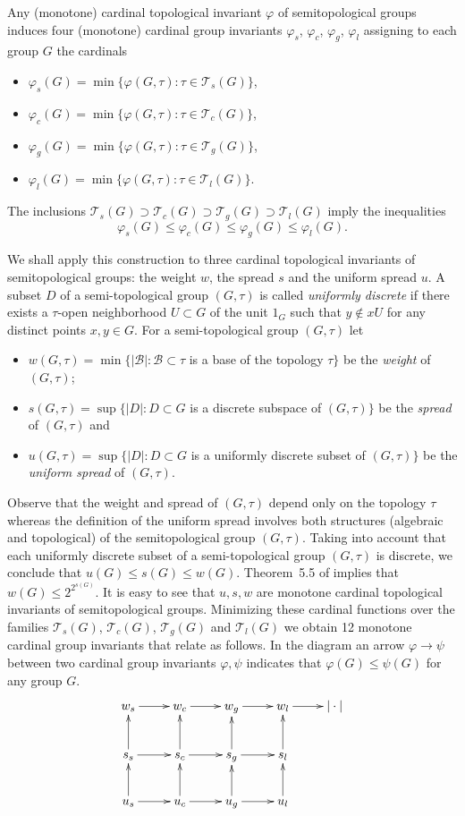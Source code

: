 \documentclass[11pt, twoside]{amsart}
\theoremstyle{definition}
\begin{document}
Any (monotone) cardinal topological invariant $\varphi$ of semitopological groups induces four (monotone) cardinal group invariants $\varphi_s$, $\varphi_c$, $\varphi_g$, $\varphi_l$ assigning to each group $G$ the cardinals
\begin{itemize}
\item $\varphi_s(G)=\min\{\varphi(G,\tau):\tau\in{\mathcal T}_s(G)\}$,
\item $\varphi_c(G)=\min\{\varphi(G,\tau):\tau\in{\mathcal T}_c(G)\}$,
\item $\varphi_g(G)=\min\{\varphi(G,\tau):\tau\in{\mathcal T}_g(G)\}$,
\item $\varphi_l(G)=\min\{\varphi(G,\tau):\tau\in{\mathcal T}_l(G)\}$.
\end{itemize}
The inclusions ${\mathcal T}_s(G)\supset{\mathcal T}_c(G)\supset{\mathcal T}_g(G)\supset{\mathcal T}_l(G)$ imply the inequalities
$$\varphi_s(G)\le\varphi_c(G)\le \varphi_g(G)\le\varphi_l(G).$$

We shall apply this construction to  three cardinal topological invariants of semitopological groups: the weight $w$, the spread $s$ and the uniform spread $u$. A subset $D$ of a semi-topological group $(G,\tau)$ is called {\em uniformly discrete} if there exists a $\tau$-open neighborhood $U\subset G$ of the unit $1_G$ such that $y\notin xU$ for any distinct points $x,y\in G$.
For a semi-topological group $(G,\tau)$  let
\begin{itemize}
\item $w(G,\tau)=\min\{|\mathcal B|:\mathcal B\subset\tau$ is a base of the topology $\tau\}$ be the {\em weight} of $(G,\tau)$;
\item $s(G,\tau)=\sup\{|D|:D\subset G$ is a discrete subspace of $(G,\tau)\}$ be the {\em spread} of $(G,\tau)$ and
\item $u(G,\tau)=\sup\{|D|:D\subset G$ is a uniformly discrete subset of $(G,\tau)\}$ be the {\em uniform spread} of $(G,\tau)$.
\end{itemize}
Observe that the weight and spread of $(G,\tau)$ depend only on the topology $\tau$ whereas the definition of the uniform spread involves both structures (algebraic and topological) of the semitopological group $(G,\tau)$. Taking into account that each uniformly discrete subset of a semi-topological group $(G,\tau)$ is discrete, we conclude that $u(G)\le s(G)\le w(G)$. Theorem~5.5 of \cite{Hodel} implies that $w(G)\le 2^{2^{s(G)}}$. It is easy to see that $u,s,w$ are monotone cardinal topological invariants of semitopological groups. Minimizing these cardinal functions over the families ${\mathcal T}_s(G)$, ${\mathcal T}_c(G)$, ${\mathcal T}_g(G)$ and ${\mathcal T}_l(G)$ we obtain 12 monotone cardinal group invariants that relate as follows. In the diagram an arrow $\varphi\to\psi$ between two cardinal group invariants $\varphi,\psi$ indicates that $\varphi(G)\le\psi(G)$ for any group $G$.
$$
\xymatrix{
w_s\ar[r]&w_c\ar[r]&w_g\ar[r]&w_l\ar[r]&|\cdot|\\
s_s\ar[r]\ar[u]&s_c\ar[r]\ar[u]&s_g\ar[r]\ar[u]&s_l\ar[u]\\
u_s\ar[r]\ar[u]&u_c\ar[r]\ar[u]&u_g\ar[r]\ar[u]&u_l\ar[u]
}
$$
\end{document}
